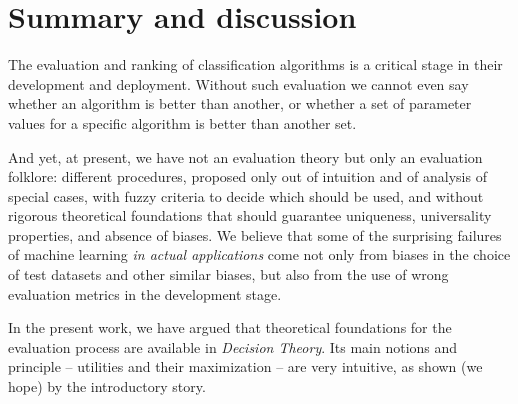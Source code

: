 \documentclass[\ifafour a4paper,12pt,\else a5paper,10pt,\fi%
onecolumn,oneside,article,%
british%
]{memoir}
\theoremstyle{remark}
\theoremstyle{innote}
\renewcommand*{\|}[1][]{\nonscript\:#1\vert\nonscript\:\mathopen{}}
\newcommand*{\eg}{{e.g.}}
\begin{document}
\section{Summary and discussion}
\label{sec:discussion}

The evaluation and ranking of classification algorithms is a critical stage in their development and deployment. Without such evaluation we cannot even say whether an algorithm is better than another, or whether a set of parameter values for a specific algorithm is better than another set.

And yet, at present, we have not an evaluation theory but only an evaluation folklore: different procedures, proposed only out of intuition and of analysis of special cases, with fuzzy criteria to decide which should be used, and without rigorous theoretical foundations that should guarantee uniqueness, universality properties, and absence of biases. We believe that some of the surprising failures of machine learning \emph{in actual applications}\autocites[see \eg][]{varoquauxetal2022} come not only from biases in the choice of test datasets and other similar biases, but also from the use of wrong evaluation metrics in the development stage.

In the present work, we have argued that theoretical foundations for the evaluation process are available in \emph{Decision Theory}. Its main notions and principle -- utilities and their maximization -- are very intuitive, as shown (we hope) by the introductory story.
\end{document}
